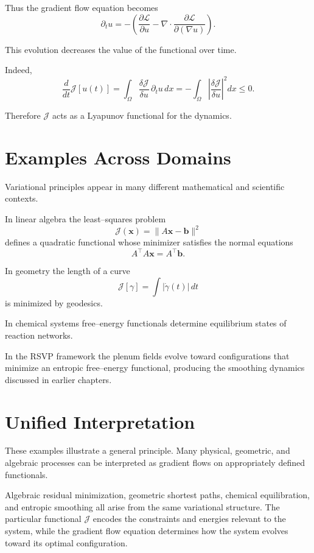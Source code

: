 \documentclass[11pt, openany]{book}
\theoremstyle{plain}
\theoremstyle{definition}
\theoremstyle{remark}
\begin{document}
Thus the gradient flow equation becomes
\[
\partial_t u
=
-
\left(
\frac{\partial\mathcal{L}}{\partial u}
-
\nabla\cdot
\frac{\partial\mathcal{L}}{\partial(\nabla u)}
\right).
\]

This evolution decreases the value of the functional over time.

Indeed,
\[
\frac{d}{dt}\mathcal{J}[u(t)]
=
\int_\Omega
\frac{\delta\mathcal{J}}{\delta u}\,
\partial_t u\,dx
=
-
\int_\Omega
\left|
\frac{\delta\mathcal{J}}{\delta u}
\right|^2 dx
\le 0.
\]

Therefore $\mathcal{J}$ acts as a Lyapunov functional for the dynamics.

\section{Examples Across Domains}

Variational principles appear in many different mathematical and
scientific contexts.

In linear algebra the least–squares problem
\[
\mathcal{J}(\mathbf{x})
=
\|A\mathbf{x}-\mathbf{b}\|^2
\]
defines a quadratic functional whose minimizer satisfies the normal
equations
\[
A^\top A\mathbf{x}=A^\top\mathbf{b}.
\]

In geometry the length of a curve
\[
\mathcal{J}[\gamma]
=
\int |\dot{\gamma}(t)|\,dt
\]
is minimized by geodesics.

In chemical systems free–energy functionals determine equilibrium
states of reaction networks.

In the RSVP framework the plenum fields evolve toward configurations
that minimize an entropic free–energy functional, producing the
smoothing dynamics discussed in earlier chapters.

\section{Unified Interpretation}

These examples illustrate a general principle.  Many physical,
geometric, and algebraic processes can be interpreted as gradient flows
on appropriately defined functionals.

Algebraic residual minimization, geometric shortest paths, chemical
equilibration, and entropic smoothing all arise from the same
variational structure.  The particular functional $\mathcal{J}$ encodes
the constraints and energies relevant to the system, while the gradient
flow equation determines how the system evolves toward its optimal
configuration.
\end{document}
